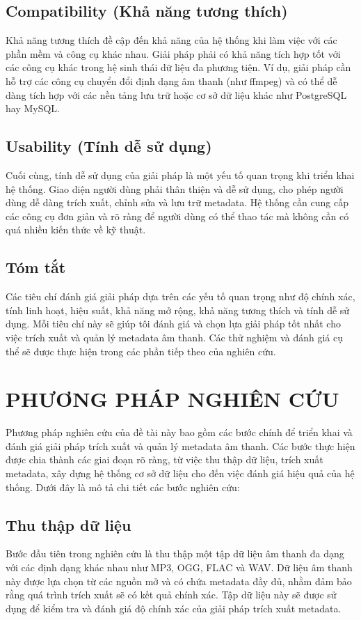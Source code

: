\documentclass[conference]{IEEEtran}
\begin{document}
\subsection{Compatibility (Khả năng tương thích)}
Khả năng tương thích đề cập đến khả năng của hệ thống khi làm việc với các phần mềm và công cụ khác nhau. Giải pháp phải có khả năng tích hợp tốt với các công cụ khác trong hệ sinh thái dữ liệu đa phương tiện. Ví dụ, giải pháp cần hỗ trợ các công cụ chuyển đổi định dạng âm thanh (như ffmpeg) và có thể dễ dàng tích hợp với các nền tảng lưu trữ hoặc cơ sở dữ liệu khác như PostgreSQL hay MySQL.

\subsection{Usability (Tính dễ sử dụng)}
Cuối cùng, tính dễ sử dụng của giải pháp là một yếu tố quan trọng khi triển khai hệ thống. Giao diện người dùng phải thân thiện và dễ sử dụng, cho phép người dùng dễ dàng trích xuất, chỉnh sửa và lưu trữ metadata. Hệ thống cần cung cấp các công cụ đơn giản và rõ ràng để người dùng có thể thao tác mà không cần có quá nhiều kiến thức về kỹ thuật.

\subsection{Tóm tắt}
Các tiêu chí đánh giá giải pháp dựa trên các yếu tố quan trọng như độ chính xác, tính linh hoạt, hiệu suất, khả năng mở rộng, khả năng tương thích và tính dễ sử dụng. Mỗi tiêu chí này sẽ giúp tôi đánh giá và chọn lựa giải pháp tốt nhất cho việc trích xuất và quản lý metadata âm thanh. Các thử nghiệm và đánh giá cụ thể sẽ được thực hiện trong các phần tiếp theo của nghiên cứu.



\section{PHƯƠNG PHÁP NGHIÊN CỨU}

Phương pháp nghiên cứu của đề tài này bao gồm các bước chính để triển khai và đánh giá giải pháp trích xuất và quản lý metadata âm thanh. Các bước thực hiện được chia thành các giai đoạn rõ ràng, từ việc thu thập dữ liệu, trích xuất metadata, xây dựng hệ thống cơ sở dữ liệu cho đến việc đánh giá hiệu quả của hệ thống. Dưới đây là mô tả chi tiết các bước nghiên cứu:

\subsection{Thu thập dữ liệu}
Bước đầu tiên trong nghiên cứu là thu thập một tập dữ liệu âm thanh đa dạng với các định dạng khác nhau như MP3, OGG, FLAC và WAV. Dữ liệu âm thanh này được lựa chọn từ các nguồn mở và có chứa metadata đầy đủ, nhằm đảm bảo rằng quá trình trích xuất sẽ có kết quả chính xác. Tập dữ liệu này sẽ được sử dụng để kiểm tra và đánh giá độ chính xác của giải pháp trích xuất metadata.
\end{document}
